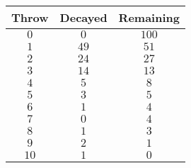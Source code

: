 \begin{tabular}{ccc}          \toprule
Throw & Decayed & Remaining \\\midrule
$0$   & $0$     & $100$     \\
$1$   & $49$    & $51$      \\
$2$   & $24$    & $27$      \\
$3$   & $14$    & $13$      \\
$4$   & $5$     & $8$       \\
$5$   & $3$     & $5$       \\
$6$   & $1$     & $4$       \\
$7$   & $0$     & $4$       \\
$8$   & $1$     & $3$       \\
$9$   & $2$     & $1$       \\
$10$  & $1$     & $0$       \\\bottomrule
\end{tabular}
